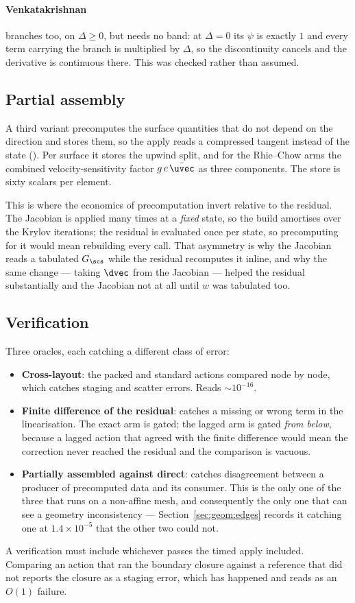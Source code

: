 \paragraph{Venkatakrishnan} branches too, on $\Delta \ge 0$, but needs no band: at $\Delta = 0$ its
$\psi$ is exactly $1$ and every term carrying the branch is multiplied by $\Delta$, so the
discontinuity cancels and the derivative is continuous there. This was checked rather than assumed.

\subsection{Partial assembly}

A third variant precomputes the surface quantities that do not depend on the direction and stores
them, so the apply reads a compressed tangent instead of the state
(). Per surface it stores the upwind split, and for the
Rhie--Chow arms the combined velocity-sensitivity factor $g\,c\,\bar{\uvec}$ as three components.
The store is sixty scalars per element.

This is where the economics of precomputation invert relative to the residual. The Jacobian is
applied many times at a \emph{fixed} state, so the build amortises over the Krylov iterations; the
residual is evaluated once per state, so precomputing for it would mean rebuilding every call.
That asymmetry is why the Jacobian reads a tabulated $G_\scs$ while the residual recomputes it
inline, and why the same change --- taking $\dvec$ from the Jacobian --- helped the residual
substantially and the Jacobian not at all until $w$ was tabulated too.

\subsection{Verification}

Three oracles, each catching a different class of error:

\begin{itemize}
\item \textbf{Cross-layout}: the packed and standard actions compared node by node, which catches
      staging and scatter errors. Reads $\sim10^{-16}$.
\item \textbf{Finite difference of the residual}: catches a missing or wrong term in the
      linearisation. The exact arm is gated; the lagged arm is gated \emph{from below}, because a
      lagged action that agreed with the finite difference would mean the correction never reached
      the residual and the comparison is vacuous.
\item \textbf{Partially assembled against direct}: catches disagreement between a producer of
      precomputed data and its consumer. This is the only one of the three that runs on a
      non-affine mesh, and consequently the only one that can see a geometry inconsistency ---
      Section~\ref{sec:geom:edges} records it catching one at $1.4\times10^{-5}$ that the other
      two could not.
\end{itemize}

A verification must include whichever passes the timed apply included. Comparing an action that
ran the boundary closure against a reference that did not reports the closure as a staging error,
which has happened and reads as an $O(1)$ failure.
